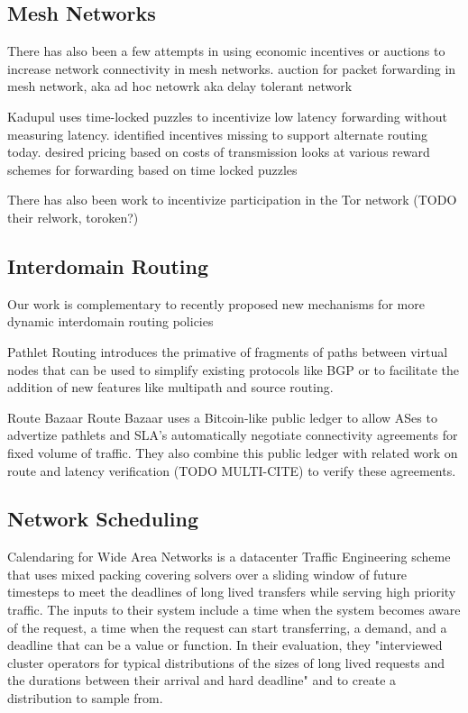 \subsection{Mesh Networks}
There has also been a few attempts in using economic incentives or auctions to increase network connectivity in mesh networks.
auction for packet forwarding in mesh network, aka ad hoc netowrk \cite{anderegg03, chen04, chen05, wang06, demir07,zhong07, kargar08, zhu08, eidenbenz08, wu10, zhong10, martignon11, martignon15} aka delay tolerant network \cite{chen13}

Kadupul \cite{kadupul15} uses time-locked puzzles to incentivize low latency forwarding without measuring latency.
identified incentives missing to support alternate routing today. desired pricing based on costs of transmission
looks at various reward schemes for forwarding based on time locked puzzles

There has also been work to incentivize participation in the Tor network\cite{torpath14, onions14} (TODO their relwork, toroken?)

\subsection{Interdomain Routing}
Our work is complementary to recently proposed new mechanisms for more dynamic interdomain routing policies

Pathlet Routing \cite{pathlet09} introduces the primative of fragments of paths between virtual nodes that can be used to simplify existing protocols like BGP or to facilitate the addition of new features like multipath and source routing.

Route Bazaar \cite{routebazaar15}
Route Bazaar uses a Bitcoin-like public ledger to allow ASes to advertize pathlets and SLA's automatically negotiate connectivity agreements for fixed volume of traffic. They also combine this public ledger with related work on route and latency verification (TODO MULTI-CITE) to verify these agreements.


\subsection{Network Scheduling}
Calendaring for Wide Area Networks \cite{tempus14}
is a datacenter Traffic Engineering scheme that uses mixed packing covering solvers over a sliding window of future timesteps to meet the deadlines of long lived transfers while serving high priority traffic.
The inputs to their system include a time when the system becomes aware of the request, a time when the request can start transferring, a demand, and a deadline that can be a value or function.
In their evaluation, they "interviewed cluster operators for typical distributions of the sizes of long lived requests and the durations between their arrival and hard deadline" and to create a distribution to sample from.


